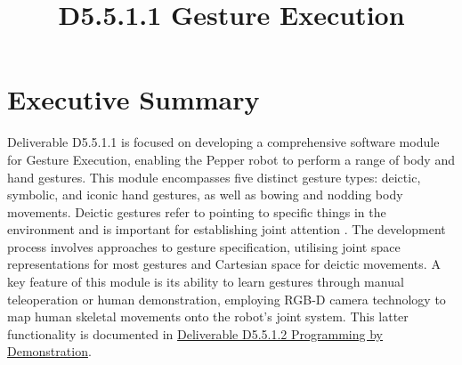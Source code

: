 \documentclass{CSSRforAfrica}
\begin{document}



\title{D5.5.1.1 Gesture Execution}   

\partner{}                       




\maketitle
 

\section*{Executive Summary}
\label{executive_summary}
 
Deliverable D5.5.1.1 is focused on developing a comprehensive software module for Gesture Execution, enabling the Pepper robot to perform a range of body and hand gestures. This module encompasses five distinct gesture types: deictic, symbolic, and iconic hand gestures, as well as bowing and nodding body movements. Deictic gestures refer to pointing to specific things in the environment and is important for establishing joint attention  \cite{Bartnecketal2020}. The development process involves approaches to gesture specification, utilising joint space representations for most gestures and Cartesian space for deictic movements. A key feature of this module is its ability to learn gestures through manual teleoperation or human demonstration, employing RGB-D camera technology to map human skeletal movements onto the robot's joint system. This latter functionality is  documented in \href{https://cssr4africa.github.io/deliverables/CSSR4Africa_Deliverable_D5.5.1.2.pdf} {Deliverable D5.5.1.2 Programming by Demonstration}.
\end{document}
